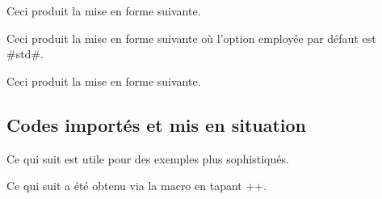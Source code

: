 \documentclass[12pt, a4paper]{article}
\begin{document}


\begin{bdocexa}
    \leavevmode

    \begin{bdoclatex}[code]
    \end{bdoclatex}

    Ceci produit la mise en forme suivante.

\end{bdocexa}




\begin{bdocexa}[À la suite]
    \leavevmode

    \begin{bdoclatex}[code]
    \end{bdoclatex}

    Ceci produit la mise en forme suivante où l'option employée par défaut est \bdocinlatex#std#.

\end{bdocexa}




\begin{bdocexa}
    \leavevmode

    \begin{bdoclatex}[code]
    \end{bdoclatex}

    Ceci produit la mise en forme suivante.

\end{bdocexa}




\subsection{Codes importés et mis en situation} \label{bdoc-latexshow}

Ce qui suit est utile pour des exemples plus sophistiqués.

\begin{bdocexa}[Showcase]
    Ce qui suit a été obtenu via la macro  en tapant \bdocinlatex++.

    \medskip

    \begin{bdoc-doc-showcase}
    \end{bdoc-doc-showcase}
\end{bdocexa}
\end{document}

